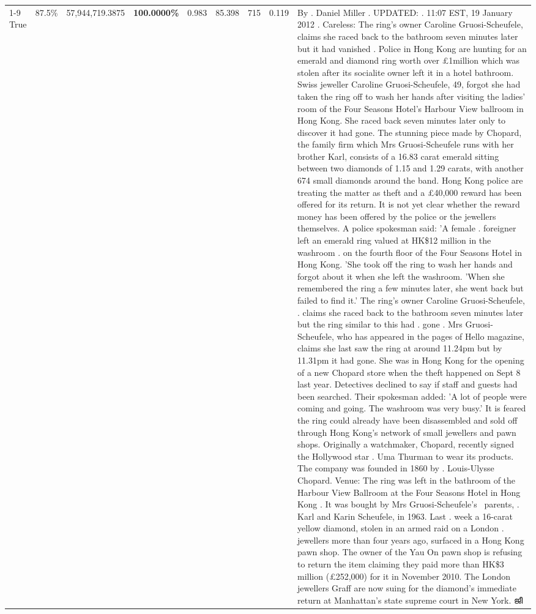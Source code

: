 \begin{table}[H]
\begin{tabular}{lllrlllll}
\cline{1-9} \cline{2-9}
True & 87.5\% & 57,944,719.3875 & \bfseries \color{red} 100.0000\% & 0.983 & 85.398 & 715 & 0.119 & By . Daniel Miller . UPDATED: . 11:07 EST, 19 January 2012 . Careless: The ring's owner Caroline Gruosi-Scheufele, claims she raced back to the bathroom seven minutes later but it had vanished . Police in Hong Kong are hunting for an emerald and diamond ring worth over £1million which was stolen after its socialite owner left it in a hotel bathroom. Swiss jeweller Caroline Gruosi-Scheufele, 49, forgot she had taken the ring off to wash her hands after visiting the ladies' room of the Four Seasons Hotel's Harbour View ballroom in Hong Kong. She raced back seven minutes later only to discover it had gone. The stunning piece made by Chopard, the family firm which Mrs Gruosi-Scheufele runs with her brother Karl, consists of a 16.83 carat emerald sitting between two diamonds of 1.15 and 1.29 carats, with another 674 small diamonds around the band. Hong Kong police are treating the matter as theft and a £40,000 reward has been offered for its return. It is not yet clear whether the reward money has been offered by the police or the jewellers themselves. A police spokesman said: 'A female . foreigner left an emerald ring valued at HK\$12 million in the washroom . on the fourth floor of the Four Seasons Hotel in Hong Kong. 'She took off the ring to wash her hands and forgot about it when she left the washroom. 'When she remembered the ring a few minutes later, she went back but failed to find it.' The ring's owner Caroline Gruosi-Scheufele, . claims she raced back to the bathroom seven minutes later but the ring similar to this had . gone . Mrs Gruosi-Scheufele, who has appeared in the pages of Hello magazine, claims she last saw the ring at around 11.24pm but by 11.31pm it had gone. She was in Hong Kong for the opening of a new Chopard store when the theft happened on Sept 8 last year. Detectives declined to say if staff and guests had been searched. Their spokesman added: 'A lot of people were coming and going. The washroom was very busy.' It is feared the ring could already have been disassembled and sold off through Hong Kong's network of small jewellers and pawn shops. Originally a watchmaker, Chopard, recently signed the Hollywood star . Uma Thurman to wear its products. The company was founded in 1860 by . Louis-Ulysse Chopard. Venue: The ring was left in the bathroom of the Harbour View Ballroom at the Four Seasons Hotel in Hong Kong . It was bought by Mrs Gruosi-Scheufele's  parents, . Karl and Karin Scheufele, in 1963. Last . week a 16-carat yellow diamond, stolen in an armed raid on a London . jewellers more than four years ago, surfaced in a Hong Kong pawn shop. The owner of the Yau On pawn shop is refusing to return the item claiming they paid more than HK\$3 million (£252,000) for it in November 2010. The London jewellers Graff are now suing for the diamond’s immediate return at Manhattan’s state supreme court in New York. ജീ \\

\end{tabular}
\end{table}
